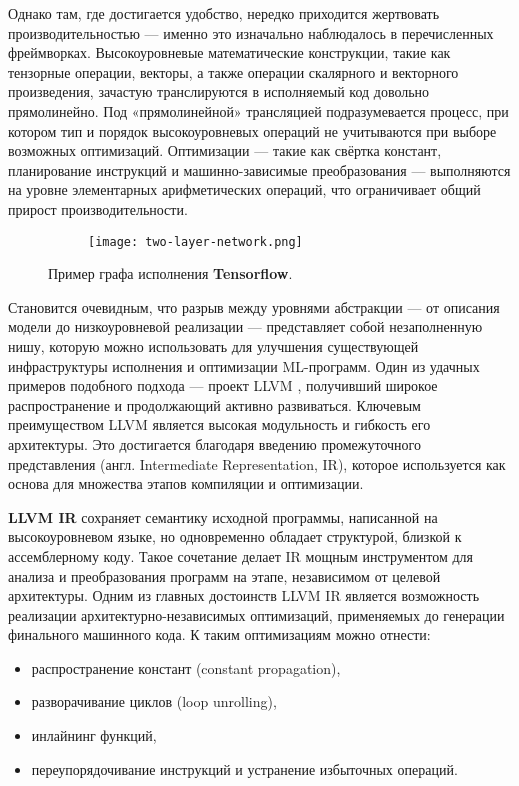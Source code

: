 Однако там, где достигается удобство, нередко приходится жертвовать производительностью — именно это изначально наблюдалось в перечисленных фреймворках.
Высокоуровневые математические конструкции, такие как тензорные операции, векторы, а также операции скалярного и векторного произведения, зачастую транслируются в исполняемый код довольно прямолинейно.
Под «прямолинейной» трансляцией подразумевается процесс, при котором тип и порядок высокоуровневых операций не учитываются при выборе возможных оптимизаций.
Оптимизации — такие как свёртка констант, планирование инструкций и машинно-зависимые преобразования — выполняются на уровне элементарных арифметических операций, что ограничивает общий прирост производительности.

\begin{figure}[h]
    \centering
    \begin{subfigure}{0.45\textwidth}
        \centering
        \texttt{[image: two-layer-network.png]}
        \label{fig:sub2}
    \end{subfigure}
    \caption{Пример графа исполнения \textbf{Tensorflow}.}
    \label{fig:main}
\end{figure}

Становится очевидным, что разрыв между уровнями абстракции — от описания модели до низкоуровневой реализации — представляет собой незаполненную нишу, которую можно использовать для улучшения существующей инфраструктуры исполнения и оптимизации ML-программ.
Один из удачных примеров подобного подхода — проект LLVM \cite{llvm_main}, получивший широкое распространение и продолжающий активно развиваться.
Ключевым преимуществом LLVM является высокая модульность и гибкость его архитектуры.
Это достигается благодаря введению промежуточного представления (англ. Intermediate Representation, IR), которое используется как основа для множества этапов компиляции и оптимизации.

\textbf{LLVM IR} \cite{llvm_main} сохраняет семантику исходной программы, написанной на высокоуровневом языке, но одновременно обладает структурой, близкой к ассемблерному коду.
Такое сочетание делает IR мощным инструментом для анализа и преобразования программ на этапе, независимом от целевой архитектуры.
Одним из главных достоинств LLVM IR является возможность реализации архитектурно-независимых оптимизаций, применяемых до генерации финального машинного кода. К таким оптимизациям можно отнести:

\begin{itemize}
    \item распространение констант (constant propagation),
    \item разворачивание циклов (loop unrolling),
    \item  инлайнинг функций,
    \item переупорядочивание инструкций и устранение избыточных операций.
\end{itemize}


